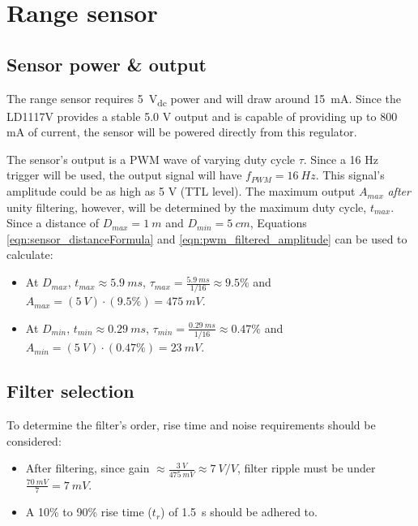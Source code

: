 \graphicspath{{content/2_design/figures/}}
\section{Range sensor}
\subsection{Sensor power \& output}{\label{rangeSensor_powerOutput}}
The range sensor requires \SI{5}{V_{dc}} power and will draw around \SI{15}{mA}. Since the LD1117V provides a stable 5.0 V output and is capable
of providing up to 800 mA of current, the sensor will be powered directly from this regulator.

The sensor's output is a PWM wave of varying duty cycle $\tau$. Since a 16 Hz trigger will be used, the output signal
will have $f_{PWM} = \SI{16}{Hz}$. This signal's amplitude could be as high as 5 V (TTL level). The maximum output $A_{max}$ \textit{after} unity filtering,
however, will be determined by the maximum duty cycle, $t_{max}$. Since a distance of $D_{max} = \SI{1}{m}$ and $D_{min} = \SI{5}{cm}$,
Equations \ref{eqn:sensor_distanceFormula} and \ref{eqn:pwm_filtered_amplitude} can be used to calculate:
\begin{itemize}
  \item At $D_{max}$, $t_{max} \approx \SI{5.9}{ms}$, $\tau_{max} = \frac{\SI{5.9}{ms}}{1/16} \approx 9.5 \%$ and $A_{max} = (\SI{5}{V}) \cdot (9.5 \%) = \SI{475}{mV} $.
  \item At $D_{min}$, $t_{min} \approx \SI{0.29}{ms}$, $\tau_{min} = \frac{\SI{0.29}{ms}}{1/16} \approx 0.47 \%$ and $A_{min} = (\SI{5}{V}) \cdot (0.47 \%) = \SI{23}{mV} $.
\end{itemize}

\subsection{Filter selection}{\label{rangeSensor_design_filter}}

To determine the filter's order, rise time and noise requirements should be considered:
\begin{itemize}
  \item After filtering, since gain $\approx \frac{\SI{3}{V}}{\SI{475}{mV}} \approx \SI{7}{V/V}$, filter ripple must be under $ \frac{\SI{70}{mV}}{7} = \SI{7}{mV}$.
  \item A 10\% to 90\% rise time ($t_r$) of \SI{1.5}{s} should be adhered to.
\end{itemize}

